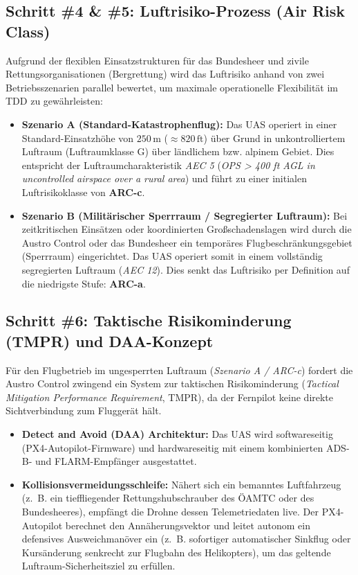 \subsection{Schritt \#4 \& \#5: Luftrisiko-Prozess (Air Risk Class)}
Aufgrund der flexiblen Einsatzstrukturen für das Bundesheer und zivile Rettungsorganisationen (Bergrettung) wird das Luftrisiko anhand von zwei Betriebsszenarien parallel bewertet, um maximale operationelle Flexibilität im TDD zu gewährleisten:
\begin{itemize}
    \item \textbf{Szenario A (Standard-Katastrophenflug):} Das UAS operiert in einer Standard-Einsatzhöhe von $250\,\text{m}$ ($\approx 820\,\text{ft}$) über Grund in unkontrolliertem Luftraum (Luftraumklasse G) über ländlichem bzw. alpinem Gebiet. 
                                                           Dies entspricht der Luftraumcharakteristik \textit{AEC 5} (\textit{OPS > 400 ft AGL in uncontrolled airspace over a rural area}) und führt zu einer initialen Luftrisikoklasse von \textbf{ARC-c}.
    \item \textbf{Szenario B (Militärischer Sperrraum / Segregierter Luftraum):} Bei zeitkritischen Einsätzen oder koordinierten Großschadenslagen wird durch die Austro Control oder das Bundesheer ein temporäres Flugbeschränkungsgebiet (Sperrraum) eingerichtet. 
                                                                                 Das UAS operiert somit in einem vollständig segregierten Luftraum (\textit{AEC 12}). Dies senkt das Luftrisiko per Definition auf die niedrigste Stufe: \textbf{ARC-a}.
\end{itemize}

\subsection{Schritt \#6: Taktische Risikominderung (TMPR) und DAA-Konzept}
Für den Flugbetrieb im ungesperrten Luftraum (\textit{Szenario A / ARC-c}) fordert die Austro Control zwingend ein System zur taktischen Risikominderung (\textit{Tactical Mitigation Performance Requirement}, TMPR), 
da der Fernpilot keine direkte Sichtverbindung zum Fluggerät hält. 
\begin{itemize}
    \item \textbf{Detect and Avoid (DAA) Architektur:} Das UAS wird softwareseitig (PX4-Autopilot-Firmware) und hardwareseitig mit einem kombinierten ADS-B- und FLARM-Empfänger ausgestattet. 
    \item \textbf{Kollisionsvermeidungsschleife:} Nähert sich ein bemanntes Luftfahrzeug (z.~B. ein tieffliegender Rettungshubschrauber des ÖAMTC oder des Bundesheeres), empfängt die Drohne dessen Telemetriedaten live. 
                                                  Der PX4-Autopilot berechnet den Annäherungsvektor und leitet autonom ein defensives Ausweichmanöver ein (z.~B. sofortiger automatischer Sinkflug oder Kursänderung senkrecht zur Flugbahn des Helikopters), 
                                                  um das geltende Luftraum-Sicherheitsziel zu erfüllen.
\end{itemize}

